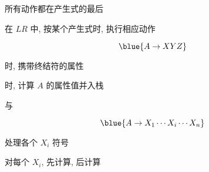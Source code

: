 \begin{frame}{}
  \begin{center}
    \begin{columns}
        \begin{center}
        \end{center}
        \begin{center}
        \end{center}
    \end{columns}

    \pause
    \vspace{0.60cm}
     所有动作都在产生式的最后

    \vspace{0.30cm}
    在 $LR$ 中, 按某个产生式时, 执行相应动作
  \end{center}
\end{frame}

\begin{frame}{}
  \begin{center}
    \[
      \blue{A \to X Y Z}
    \]


    时, 携带终结符的属性

    \vspace{0.30cm}
    时, 计算 $A$ 的属性值并入栈
  \end{center}
\end{frame}

\begin{frame}{}
  
\end{frame}

\begin{frame}{}
  \begin{center}
     与 

    \vspace{0.30cm}

    \pause
    \vspace{-0.50cm}
    \[
      \blue{A \to X_{1} \cdots X_{i} \cdots X_{n}}
    \]

     处理各个 $X_{i}$ 符号

    \vspace{0.10cm}
    对每个 $X_{i}$, 先计算, 后计算
  \end{center}
\end{frame}

